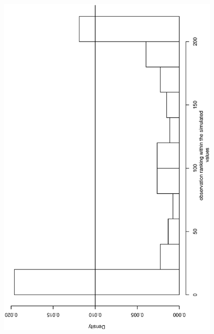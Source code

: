 \documentclass[11pt, fleqn]{article}
\begin{document}
\begin{figure}[t]
\begin{center}
\begin{minipage}{8cm}
\includegraphics[scale=0.3, angle=-90]{pic/mr_pit_present.ps}
\end{minipage}
\hfill
\begin{minipage}{8cm}

\end{minipage}
\end{center}
\end{figure}
\end{document}
